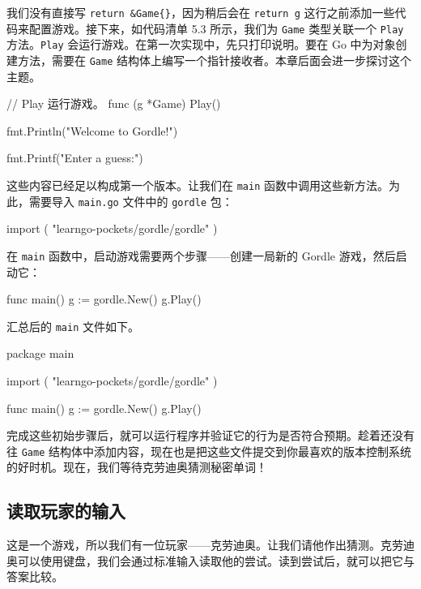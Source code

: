 我们没有直接写 \texttt{return \&Game\{\}}，因为稍后会在 \texttt{return g} 这行之前添加一些代码来配置游戏。接下来，如代码清单 5.3 所示，我们为 \texttt{Game} 类型关联一个 \texttt{Play} 方法。\texttt{Play} 会运行游戏。在第一次实现中，先只打印说明。要在 Go 中为对象创建方法，需要在 \texttt{Game} 结构体上编写一个指针接收者。本章后面会进一步探讨这个主题。

\begin{gocode}[title={代码清单 5.3 \texttt{game.go}：使用 \texttt{Play} 运行游戏}]
// Play 运行游戏。
func (g *Game) Play() {
    fmt.Println("Welcome to Gordle!")

    fmt.Printf("Enter a guess:\n")
}
\end{gocode}

这些内容已经足以构成第一个版本。让我们在 \texttt{main} 函数中调用这些新方法。为此，需要导入
\texttt{main.go} 文件中的 \texttt{gordle} 包：

\begin{gocode}[]
import (
    "learngo-pockets/gordle/gordle"
)
\end{gocode}

在 \texttt{main} 函数中，启动游戏需要两个步骤——创建一局新的 Gordle 游戏，然后启动它：

\begin{gocode}[]
func main() {
    g := gordle.New()
    g.Play()
}
\end{gocode}

汇总后的 \texttt{main} 文件如下。

\begin{gocode}[title={代码清单 5.4 \texttt{main.go}：\texttt{main} 函数和包}]
package main

import (
    "learngo-pockets/gordle/gordle"
)

func main() {
    g := gordle.New()
    g.Play()
}
\end{gocode}

完成这些初始步骤后，就可以运行程序并验证它的行为是否符合预期。趁着还没有往 \texttt{Game} 结构体中添加内容，现在也是把这些文件提交到你最喜欢的版本控制系统的好时机。现在，我们等待克劳迪奥猜测秘密单词！

\subsection{读取玩家的输入}

这是一个游戏，所以我们有一位玩家——克劳迪奥。让我们请他作出猜测。克劳迪奥可以使用键盘，我们会通过标准输入读取他的尝试。读到尝试后，就可以把它与答案比较。

